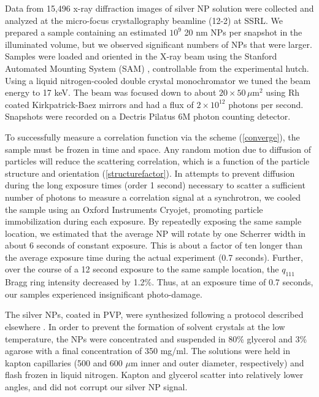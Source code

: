 \documentclass [11pt,fleqn]{article}
\begin{document}
Data from 15,496 x-ray diffraction images \cite{data} of silver NP solution were collected and analyzed at the micro-focus crystallography beamline (12-2) at SSRL. We prepared a sample containing an estimated $10^{9}$  20 nm NPs per snapshot in the illuminated volume, but we observed significant numbers of NPs that were larger. Samples were loaded and oriented in the X-ray beam using the Stanford Automated Mounting System (SAM) \cite{Cohen:2002jw}, controllable from the experimental hutch. Using a liquid nitrogen-cooled double crystal monochromator we tuned the beam energy to 17 keV. The beam was focused down to about $20 \times 50 \,\mu$m$^2$ using Rh coated Kirkpatrick-Baez mirrors and had a flux of $2\times 10^{12}$ photons per second. Snapshots were recorded on a Dectris Pilatus 6M photon counting detector. 

To successfully measure a correlation function via the scheme (\ref{converge}), the sample must be frozen in time and space. Any random motion due to diffusion of particles will reduce the scattering correlation, which is a function of the particle structure and orientation (\ref{structurefactor}). In attempts to prevent diffusion during the long exposure times (order 1 second) necessary to scatter a sufficient number of photons to measure a correlation signal at a synchrotron, we cooled the sample using an Oxford Instruments Cryojet, promoting particle immobilization during each exposure. By repeatedly exposing the same sample location, we estimated that the average NP will rotate by one Scherrer width in about 6 seconds of constant exposure. This is about a factor of ten longer than the average exposure time during the actual experiment (0.7 seconds). Further, over the course of a 12 second exposure to the same sample location, the $q_{111}$ Bragg ring intensity decreased by 1.2\%. Thus, at an exposure time of 0.7 seconds, our samples experienced insignificant photo-damage.

The silver NPs, coated in PVP, were synthesized following a protocol described elsewhere \cite{Levard:2011bx}. In order to prevent the formation of solvent crystals at the low temperature, the NPs were concentrated and suspended in 80\% glycerol and 3\% agarose with a final concentration of 350 mg/ml. The solutions were held in kapton capillaries (500 and 600 $\mu$m inner and outer diameter, respectively) and flash frozen in liquid nitrogen. Kapton and glycerol scatter into relatively lower angles, and did not corrupt our silver NP signal.
\end{document}
